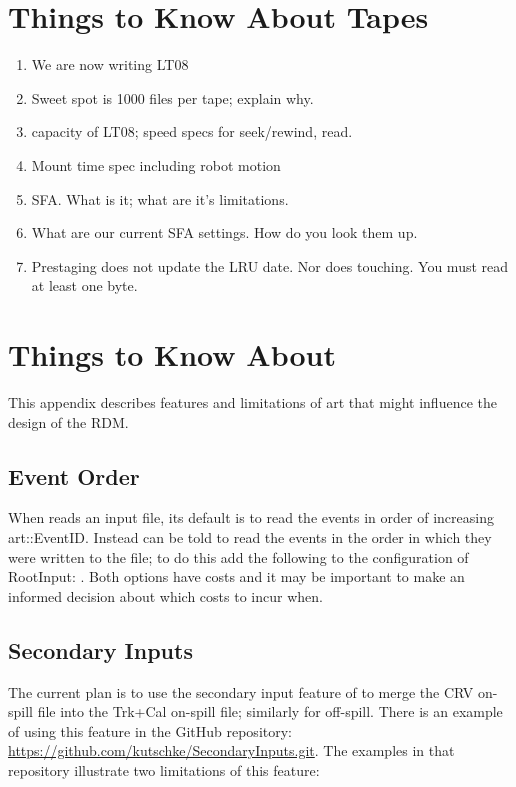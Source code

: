 \chapter{Things to Know About Tapes}
\label{app:AboutTapes}

\begin{enumerate}
  \item We are now writing LT08
  \item Sweet spot is 1000 files per tape; explain why.
  \item capacity of LT08; speed specs for seek/rewind, read.
  \item Mount time spec including robot motion
  \item SFA.  What is it; what are it's limitations.
  \item What are our current SFA settings.  How do you look them up.
  \item Prestaging does not update the LRU date.  Nor does touching.  You must read at least one byte.
\end{enumerate}

\chapter{Things to Know About \art}
\label{app:Aboutart}

This appendix describes features and limitations of art that might influence the design
of the RDM.

\section{Event Order }
\label{appsec:EventOrder}

When \art reads an input file, its default is to read the events in order of increasing {\code art::EventID}.
Instead \art can be told to read the events in the order in which they were written to the file; to do this
add the following to the configuration of {\code RootInput}: .
Both options have costs and it may be important to make an informed decision about which costs to incur when.

\section{Secondary Inputs}
\label{appsec:SecondaryInputs}

The current plan is to use the secondary input feature of \art to merge the CRV on-spill file
into the Trk+Cal on-spill file; similarly for off-spill. There is an example of using this feature in the GitHub repository:
\href{https://github.com/kutschke/SecondaryInputs.git}{https://github.com/kutschke/SecondaryInputs.git}.
The examples in that repository illustrate two limitations of this feature:

